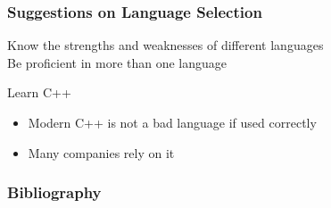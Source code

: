\documentclass[xetex,professionalfont]{beamer}
\begin{document}

\begin{frame}
\frametitle{Suggestions on Language Selection}

Know the strengths and weaknesses of different languages\\\medskip
Be proficient in more than one language

\bigskip
Learn C++
\begin{itemize}
	\item Modern C++ is not a bad language if used correctly
	\item Many companies rely on it
\end{itemize}

\end{frame}


\begin{frame}
\frametitle{Bibliography}

\printbibliography

\end{frame}
\end{document}
